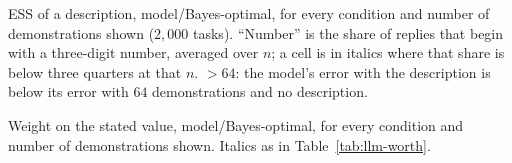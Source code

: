 \documentclass{article}
\begin{document}
\begin{table}[t]
\centering\scriptsize
\setlength{\tabcolsep}{2.5pt}
\caption{ESS of a description, model/Bayes-optimal, for every condition and number of demonstrations shown ($2{,}000$ tasks). ``Number'' is the share of replies that begin with a three-digit number, averaged over $n$; a cell is in italics where that share is below three quarters at that $n$. $> 64$: the model's error with the description is below its error with $64$ demonstrations and no description.}
\label{tab:llm-worth}
\vspace{3pt}

\end{table}

\begin{table}[t]
\centering\scriptsize
\setlength{\tabcolsep}{2.5pt}
\caption{Weight on the stated value, model/Bayes-optimal, for every condition and number of demonstrations shown. Italics as in Table~\ref{tab:llm-worth}.}
\label{tab:llm-full}
\vspace{3pt}

\end{table}
\end{document}
